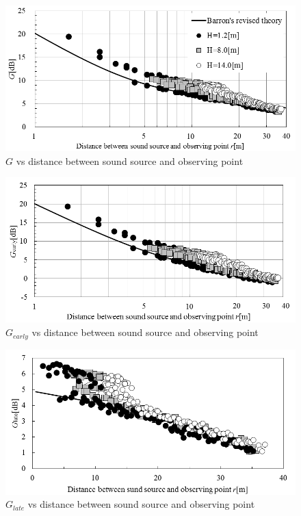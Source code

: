 \begin{figure}[H]
    \centering
    \includegraphics[keepaspectratio,scale=1]{04_att/G_Barron.png}
    \caption{\hspace{1mm}$G$ vs distance between sound source and observing point}
    \label{fig:G_Barron}
\end{figure}

\begin{figure}[H]
    \centering
    \includegraphics[keepaspectratio,scale=1]{04_att/Ge_Barron.png}
    \caption{\hspace{1mm}$G_{early}$ vs distance between sound source and observing point}
    \label{fig:Ge_Barron}
\end{figure}

\begin{figure}[H]
    \centering
    \includegraphics[keepaspectratio,scale=1]{04_att/Gl_Barron.png}
    \caption{\hspace{1mm}$G_{late}$ vs distance between sound source and observing point}
    \label{fig:Gl_Barron}
\end{figure}

